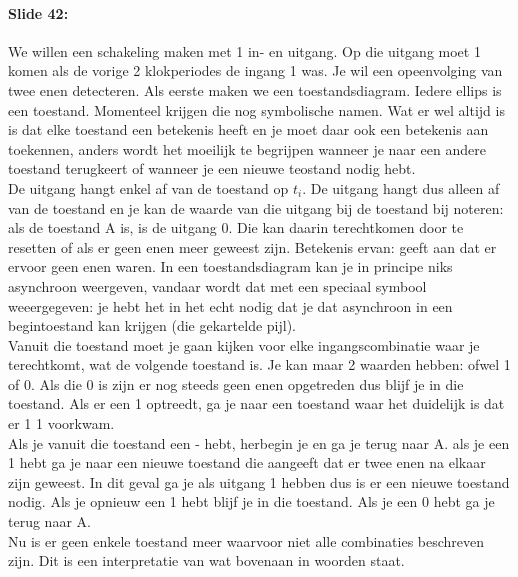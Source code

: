 \documentclass[10pt,a4paper]{book}
\begin{document}
\paragraph{Slide 42:} We willen een schakeling maken met 1 in- en uitgang. Op die uitgang moet 1 komen als de vorige 2 klokperiodes de ingang 1 was. Je wil een opeenvolging van twee enen detecteren. Als eerste maken we een toestandsdiagram. Iedere ellips is een toestand. Momenteel krijgen die nog symbolische namen. Wat er wel altijd is is dat elke toestand een betekenis heeft en je moet daar ook een betekenis aan toekennen, anders wordt het moeilijk te begrijpen wanneer je naar een andere toestand terugkeert of wanneer je een nieuwe teostand nodig hebt.\\
De uitgang hangt enkel af van de toestand op $t_i$. De uitgang hangt dus alleen af van de toestand en je kan de waarde van die uitgang bij de toestand bij noteren: als de toestand A is, is de uitgang 0. Die kan daarin terechtkomen door te resetten of als er geen enen meer geweest zijn. Betekenis ervan: geeft aan dat er ervoor geen enen waren. In een toestandsdiagram kan je in principe niks asynchroon weergeven, vandaar wordt dat met een speciaal symbool weeergegeven: je hebt het in het echt nodig dat je dat asynchroon in een begintoestand kan krijgen (die gekartelde pijl).\\
Vanuit die toestand moet je gaan kijken voor elke ingangscombinatie waar je terechtkomt, wat de volgende toestand is. Je kan maar 2 waarden hebben: ofwel 1 of 0. Als die 0 is zijn er nog steeds geen enen opgetreden dus blijf je in die toestand. Als er een 1 optreedt, ga je naar een toestand waar het duidelijk is dat er 1 1 voorkwam.\\
Als je vanuit die toestand een - hebt, herbegin je en ga je terug naar A. als je een 1 hebt ga je naar een nieuwe toestand die aangeeft dat er twee enen na elkaar zijn geweest. In dit geval ga je als uitgang 1 hebben dus is er een nieuwe toestand nodig. Als je opnieuw een 1 hebt blijf je in die toestand. Als je een 0 hebt ga je terug naar A.\\
Nu is er geen enkele toestand meer waarvoor niet alle combinaties beschreven zijn. Dit is een interpretatie van wat bovenaan in woorden staat.
\end{document}
